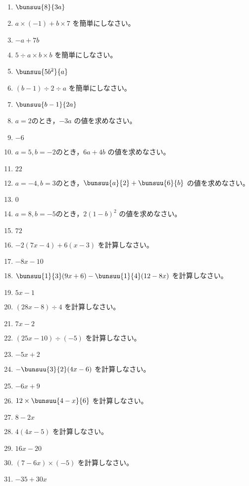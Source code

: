 \documentclass[uplatex,a4j,11pt]{jsreport}
\begin{document}
\begin{multicols}{2}
\begin{enumerate}
    \item $\bunsuu{8}{3a}$
    \item $a \times (-1) + b \times 7$ を簡単にしなさい。%
    \item $-a+7b$
    \item $5 \div a \times b \times b$ を簡単にしなさい。%
    \item $\bunsuu{5b^2}{a}$
    \item $(b - 1) \div 2 \div a$ を簡単にしなさい。%
    \item $\bunsuu{b-1}{2a}$
    \item $a=2$のとき，$-3a$ の値を求めなさい。%
    \item $-6$
    \item $a=5, b=-2$のとき，$6a+4b$ の値を求めなさい。%
    \item $22$
    \item $a=-4, b=3$のとき，$\bunsuu{a}{2}+\bunsuu{6}{b}$ の値を求めなさい。%
    \item $0$
    \item $a=8, b=-5$のとき，$2(1-b)^2$ の値を求めなさい。%
    \item $72$
    \item $-2(7x-4)+6(x-3)$ を計算しなさい。%
    \item $-8x-10$
    \item $\bunsuu{1}{3}(9x+6)-\bunsuu{1}{4}(12-8x)$ を計算しなさい。%
    \item $5x-1$
    \item $(28x -8)\div4$ を計算しなさい。%
    \item $7x-2$
    \item $(25x -10)\div(-5)$ を計算しなさい。%
    \item $-5x+2$
    \item $-\bunsuu{3}{2}(4x-6)$ を計算しなさい。%
    \item $-6x+9$
    \item $12\times\bunsuu{4-x}{6}$ を計算しなさい。%
    \item $8-2x$
    \item $4(4x-5)$ を計算しなさい。%
    \item $16x-20$
    \item $(7-6x)\times(-5)$ を計算しなさい。%
    \item $-35+30x$

\end{enumerate}
\end{multicols}
\end{document}
